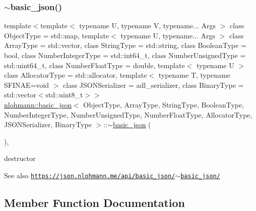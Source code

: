 \subsubsection{\texorpdfstring{$\sim$basic\+\_\+json()}{~basic\_json()}}
{\footnotesize\ttfamily template$<$template$<$ typename U, typename V, typename... Args $>$ class Object\+Type = std\+::map, template$<$ typename U, typename... Args $>$ class Array\+Type = std\+::vector, class String\+Type  = std\+::string, class Boolean\+Type  = bool, class Number\+Integer\+Type  = std\+::int64\+\_\+t, class Number\+Unsigned\+Type  = std\+::uint64\+\_\+t, class Number\+Float\+Type  = double, template$<$ typename U $>$ class Allocator\+Type = std\+::allocator, template$<$ typename T, typename S\+F\+I\+N\+A\+E=void $>$ class J\+S\+O\+N\+Serializer = adl\+\_\+serializer, class Binary\+Type  = std\+::vector$<$std\+::uint8\+\_\+t$>$$>$ \\
\hyperlink{classnlohmann_1_1basic__json}{nlohmann\+::basic\+\_\+json}$<$ Object\+Type, Array\+Type, String\+Type, Boolean\+Type, Number\+Integer\+Type, Number\+Unsigned\+Type, Number\+Float\+Type, Allocator\+Type, J\+S\+O\+N\+Serializer, Binary\+Type $>$\+::$\sim$\hyperlink{classnlohmann_1_1basic__json}{basic\+\_\+json} (\begin{DoxyParamCaption}{ }\end{DoxyParamCaption})\hspace{0.3cm}{\ttfamily [inline]}, {\ttfamily [noexcept]}}



destructor 

\begin{DoxySeeAlso}{See also}
\href{https://json.nlohmann.me/api/basic_json/~basic_json/}{\tt https\+://json.\+nlohmann.\+me/api/basic\+\_\+json/$\sim$basic\+\_\+json/} 
\end{DoxySeeAlso}


\subsection{Member Function Documentation}
\mbox{\label{classnlohmann_1_1basic__json_a32872afe5bfd040777e3e2bb85f0ca55}} 
